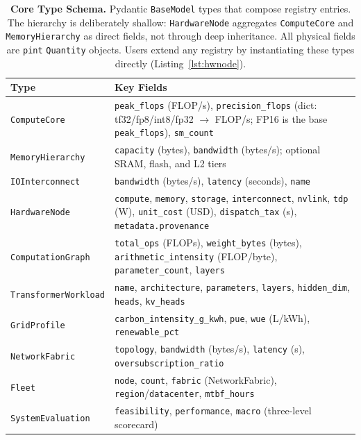 \documentclass[10pt,twocolumn]{article}
\begin{document}
\begin{appendices}
\begin{table}[!t]
\centering
\small
\renewcommand{\arraystretch}{1.08}
\caption{\textbf{Core Type Schema.} Pydantic \texttt{BaseModel} types that compose registry entries. The hierarchy is deliberately shallow: \texttt{HardwareNode} aggregates \texttt{ComputeCore} and \texttt{MemoryHierarchy} as direct fields, not through deep inheritance. All physical fields are \texttt{pint} \texttt{Quantity} objects. Users extend any registry by instantiating these types directly (Listing~\ref{lst:hwnode}).}
\label{tab:type-schema}
\begin{tabularx}{\textwidth}{@{}l X@{}}
\toprule
\textbf{Type} & \textbf{Key Fields} \\
\midrule
\texttt{ComputeCore}       & \texttt{peak\_flops} (FLOP/s), \texttt{precision\_flops} (dict: tf32/fp8/int8/fp32 $\to$ FLOP/s; FP16 is the base \texttt{peak\_flops}), \texttt{sm\_count} \\
\texttt{MemoryHierarchy}   & \texttt{capacity} (bytes), \texttt{bandwidth} (bytes/s); optional SRAM, flash, and L2 tiers \\
\texttt{IOInterconnect}    & \texttt{bandwidth} (bytes/s), \texttt{latency} (seconds), \texttt{name} \\
\texttt{HardwareNode}      & \texttt{compute}, \texttt{memory}, \texttt{storage}, \texttt{interconnect}, \texttt{nvlink}, \texttt{tdp} (W), \texttt{unit\_cost} (USD), \texttt{dispatch\_tax} (s), \texttt{metadata.provenance} \\
\texttt{ComputationGraph}  & \texttt{total\_ops} (FLOPs), \texttt{weight\_bytes} (bytes), \texttt{arithmetic\_intensity} (FLOP/byte), \texttt{parameter\_count}, \texttt{layers} \\
\texttt{TransformerWorkload} & \texttt{name}, \texttt{architecture}, \texttt{parameters}, \texttt{layers}, \texttt{hidden\_dim}, \texttt{heads}, \texttt{kv\_heads} \\
\texttt{GridProfile}       & \texttt{carbon\_intensity\_g\_kwh}, \texttt{pue}, \texttt{wue} (L/kWh), \texttt{renewable\_pct} \\
\texttt{NetworkFabric}     & \texttt{topology}, \texttt{bandwidth} (bytes/s), \texttt{latency} (s), \texttt{oversubscription\_ratio} \\
\texttt{Fleet}             & \texttt{node}, \texttt{count}, \texttt{fabric} (NetworkFabric), \texttt{region}/\texttt{datacenter}, \texttt{mtbf\_hours} \\
\texttt{SystemEvaluation}  & \texttt{feasibility}, \texttt{performance}, \texttt{macro} (three-level scorecard) \\
\bottomrule
\end{tabularx}
\end{table}


\end{appendices}
\end{document}
